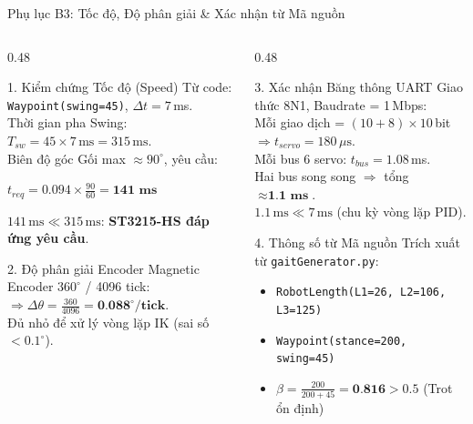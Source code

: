 \documentclass[10pt,aspectratio=169]{beamer}
\begin{document}
\begin{frame}{Phụ lục B3: Tốc độ, Độ phân giải \& Xác nhận từ Mã nguồn}
  \begin{columns}[t]
      \begin{column}{0.48\textwidth}
          \begin{block}{1. Kiểm chứng Tốc độ (Speed)}
              Từ code: \texttt{Waypoint(swing=45)}, $\Delta t = 7\,$ms.\\
              Thời gian pha Swing: $T_{sw} = 45 \times 7\,\text{ms} = 315\,\text{ms}$.\\
              Biên độ góc Gối max $\approx 90^\circ$, yêu cầu:
              \begin{center}
                  $t_{req} = 0.094 \times \frac{90}{60} = \textbf{141 ms}$
              \end{center}
              $141\,\text{ms} \ll 315\,\text{ms}$: \textbf{ST3215-HS đáp ứng yêu cầu}.
          \end{block}
          \vspace{0.05cm}
          \begin{block}{2. Độ phân giải Encoder}
              Magnetic Encoder $360^\circ$ / 4096 tick:\\
              $\Rightarrow \Delta\theta = \frac{360}{4096} = \textbf{0.088}^\circ/\textbf{tick}$.\\
              Đủ nhỏ để xử lý vòng lặp IK (sai số $< 0.1^\circ$).
          \end{block}
      \end{column}
      \begin{column}{0.48\textwidth}
          \begin{block}{3. Xác nhận Băng thông UART}
              Giao thức 8N1, Baudrate = 1\,Mbps:\\
              Mỗi giao dịch = $(10+8) \times 10\,$bit $\Rightarrow t_{servo} = 180\,\mu\text{s}$.\\
              Mỗi bus 6 servo: $t_{bus} = 1.08\,$ms.\\
              Hai bus song song $\Rightarrow$ tổng $\approx \textbf{1.1 ms}$.\\
              $1.1\,\text{ms} \ll 7\,\text{ms}$ (chu kỳ vòng lặp PID).
          \end{block}
          \vspace{0.05cm}
          \begin{block}{4. Thông số từ Mã nguồn}
              Trích xuất từ \texttt{gaitGenerator.py}:
              \begin{itemize}
                  \item \texttt{RobotLength(L1=26, L2=106, L3=125)}
                  \item \texttt{Waypoint(stance=200, swing=45)}
                  \item $\beta = \frac{200}{200+45} = \textbf{0.816} > 0.5$ {\small (Trot ổn định)}
              \end{itemize}
          \end{block}
      \end{column}
  \end{columns}
\end{frame}
\end{document}
